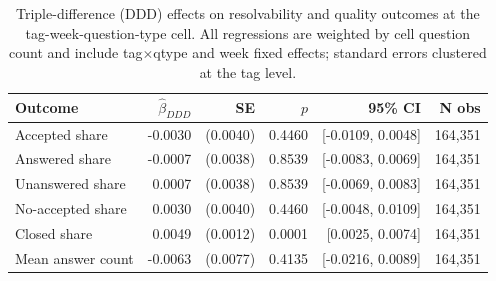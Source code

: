 \begin{table}[ht]
\centering
\caption{Triple-difference (DDD) effects on resolvability and quality outcomes at the tag-week-question-type cell. All regressions are weighted by cell question count and include tag$\times$qtype and week fixed effects; standard errors clustered at the tag level.}
\label{tab:resolvability}
\begin{tabular}{lrrrrr}
\toprule
Outcome & $\hat\beta_{DDD}$ & SE & $p$ & 95\% CI & N obs \\
\midrule
Accepted share & -0.0030 & (0.0040) & 0.4460 & [-0.0109, 0.0048] & 164,351 \\
Answered share & -0.0007 & (0.0038) & 0.8539 & [-0.0083, 0.0069] & 164,351 \\
Unanswered share & 0.0007 & (0.0038) & 0.8539 & [-0.0069, 0.0083] & 164,351 \\
No-accepted share & 0.0030 & (0.0040) & 0.4460 & [-0.0048, 0.0109] & 164,351 \\
Closed share & 0.0049 & (0.0012) & 0.0001 & [0.0025, 0.0074] & 164,351 \\
Mean answer count & -0.0063 & (0.0077) & 0.4135 & [-0.0216, 0.0089] & 164,351 \\
\bottomrule
\end{tabular}
\end{table}